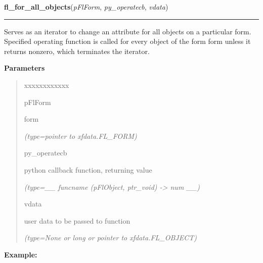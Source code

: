     \label{xformslib:flbasic:fl_for_all_objects}

    \vspace{0.5ex}

\hspace{.8\funcindent}\begin{boxedminipage}{\funcwidth}

    \raggedright \textbf{fl\_for\_all\_objects}(\textit{pFlForm}, \textit{py\_operatecb}, \textit{vdata})

    \vspace{-1.5ex}

    \rule{\textwidth}{0.5\fboxrule}
\setlength{\parskip}{2ex}
    Serves as an iterator to change an attribute for all objects on a 
    particular form. Specified operating function is called for every 
    object of the form form unless it returns nonzero, which terminates the
    iterator.

\setlength{\parskip}{1ex}
      \textbf{Parameters}
      \vspace{-1ex}

      \begin{quote}
        \begin{Ventry}{xxxxxxxxxxxx}

          \item[pFlForm]

          form

            {\it (type=pointer to xfdata.FL\_FORM)}

          \item[py\_operatecb]

          python callback function, returning value

            {\it (type=\_\_ funcname (pFlObject, ptr\_void) -{\textgreater} num \_\_)}

          \item[vdata]

          user data to be passed to function

            {\it (type=None or long or pointer to xfdata.FL\_OBJECT)}

        \end{Ventry}

      \end{quote}

\textbf{Example:}
\begin{quote}
  \begin{itemize}


\end{itemize}
\end{quote}
\end{boxedminipage}
